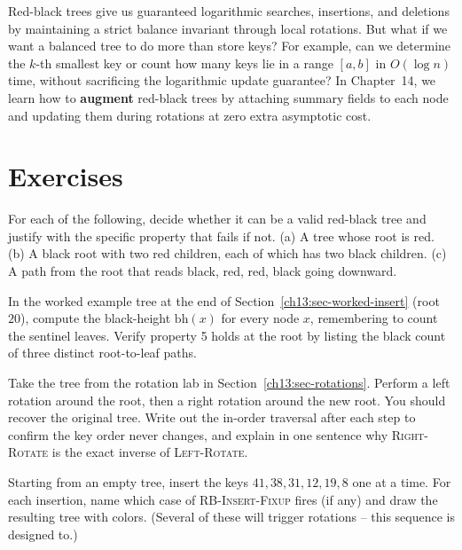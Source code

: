 Red-black trees give us guaranteed logarithmic searches, insertions, and deletions
by maintaining a strict balance invariant through local rotations. But what if we
want a balanced tree to do more than store keys? For example, can we determine the
$k$-th smallest key or count how many keys lie in a range $[a, b]$ in $O(\log n)$
time, without sacrificing the logarithmic update guarantee? In Chapter~14, we learn
how to \textbf{augment} red-black trees by attaching summary fields to each node
and updating them during rotations at zero extra asymptotic cost.

\section*{Exercises}

\begin{exercise}\label{ch13:ex-legal}
For each of the following, decide whether it can be a valid red-black tree and
justify with the specific property that fails if not.
(a) A tree whose root is red.
(b) A black root with two red children, each of which has two black children.
(c) A path from the root that reads black, red, red, black going downward.
\end{exercise}

\begin{exercise}\label{ch13:ex-bh}
In the worked example tree at the end of Section~\ref{ch13:sec-worked-insert} (root $20$), compute the
black-height $\mathrm{bh}(x)$ for every node $x$, remembering to count the
sentinel leaves. Verify property 5 holds at the root by listing the black count of
three distinct root-to-leaf paths.
\end{exercise}

\begin{exercise}\label{ch13:ex-rotate}
Take the tree from the rotation lab in Section~\ref{ch13:sec-rotations}. Perform a left rotation
around the root, then a right rotation around the new root. You should recover the
original tree. Write out the in-order traversal after each step to confirm the key
order never changes, and explain in one sentence why \textsc{Right-Rotate} is the
exact inverse of \textsc{Left-Rotate}.
\end{exercise}

\begin{exercise}\label{ch13:ex-insert}
Starting from an empty tree, insert the keys $41, 38, 31, 12, 19, 8$ one at a
time. For each insertion, name which case of \textsc{RB-Insert-Fixup} fires (if
any) and draw the resulting tree with colors. (Several of these will trigger
rotations -- this sequence is designed to.)
\end{exercise}

